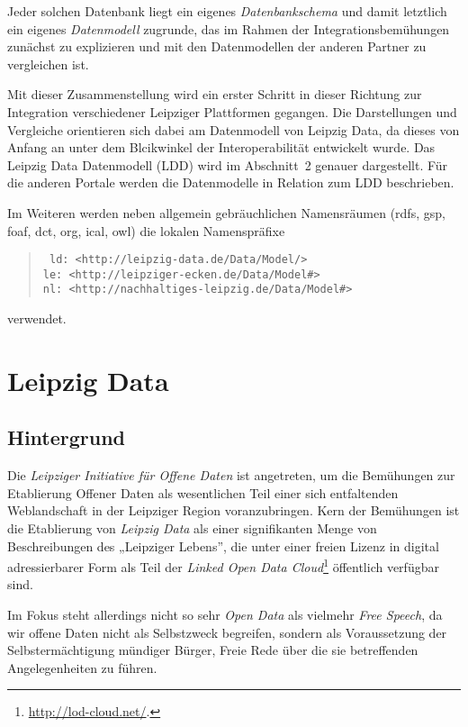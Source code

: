 \documentclass[a4paper,11pt]{article}
\begin{document}
Jeder solchen Datenbank liegt ein eigenes \emph{Datenbankschema} und damit
letztlich ein eigenes \emph{Datenmodell} zugrunde, das im Rahmen der
Integrationsbemühungen zunächst zu explizieren und mit den Datenmodellen der
anderen Partner zu vergleichen ist. 

Mit dieser Zusammenstellung wird ein erster Schritt in dieser Richtung zur
Integration verschiedener Leipziger Plattformen gegangen.  Die Darstellungen
und Vergleiche orientieren sich dabei am Datenmodell von Leipzig Data, da
dieses von Anfang an unter dem Blcikwinkel der Interoperabilität entwickelt
wurde.  Das Leipzig Data Datenmodell (LDD) wird im Abschnitt~2 genauer
dargestellt. Für die anderen Portale werden die Datenmodelle in Relation zum
LDD beschrieben.

Im Weiteren werden neben allgemein gebräuchlichen Namensräumen (rdfs, gsp,
foaf, dct, org, ical, owl) die lokalen Namenspräfixe
\begin{quote}\tt
  ld: <http://leipzig-data.de/Data/Model/> \\ 
  le: <http://leipziger-ecken.de/Data/Model\#> \\ 
  nl: <http://nachhaltiges-leipzig.de/Data/Model\#>
\end{quote}
verwendet.
\newpage

\section{Leipzig Data}

\subsection{Hintergrund}

Die \emph{Leipziger Initiative für Offene Daten} ist angetreten, um die
Bemühungen zur Etablierung Offener Daten als wesentlichen Teil einer sich
entfaltenden Weblandschaft in der Leipziger Region voranzubringen.  Kern der
Bemühungen ist die Etablierung von \emph{Leipzig Data} als einer signifikanten
Menge von Beschreibungen des „Leipziger Lebens”, die unter einer freien Lizenz
in digital adressierbarer Form als Teil der \emph{Linked Open Data
  Cloud}\footnote{\url{http://lod-cloud.net/}.} öffentlich verfügbar sind.

Im Fokus steht allerdings nicht so sehr \emph{Open Data} als vielmehr
\emph{Free Speech}, da wir offene Daten nicht als Selbstzweck begreifen,
sondern als Voraussetzung der Selbstermächtigung mündiger Bürger, Freie Rede
über die sie betreffenden Angelegenheiten zu führen.
\end{document}
